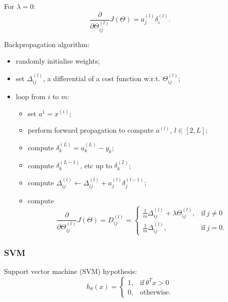 \documentclass[a4paper,11pt]{article}
\begin{document}
For \textcolor{OliveGreen}{$\lambda = 0$}:
\begin{equation}
\frac{\partial}{\partial \Theta_{ij} ^{(l)}} J \left( \Theta \right) = a_j ^{(l)} \delta_i ^{(l)} .
\end{equation}

Backpropagation algorithm:
\begin{itemize}
\item randomly initialise weights;
\item set \textcolor{OliveGreen}{$\Delta_{ij} ^{(l)}$}, a differential of a cost function w.r.t. \textcolor{OliveGreen}{$\Theta_{ij} ^{(l)}$};
\item loop from \textcolor{OliveGreen}{$i$} to \textcolor{OliveGreen}{$m$}:
\begin{itemize}
\item[--] set \textcolor{OliveGreen}{$a^{1} = x^{(i)}$};
\item[--] perform forward propagation to compute \textcolor{OliveGreen}{$a^{(l)}$}, \textcolor{OliveGreen}{$l \in \left[2, L \right]$};
\item[--] compute \textcolor{OliveGreen}{$\delta_k ^{(L)} = a_k ^{(L)} - y_k$};
\item[--] compute \textcolor{OliveGreen}{$\delta_k ^{(L-1)}$}, etc up to \textcolor{OliveGreen}{$\delta_k ^{(2)}$};
\item[--] compute \textcolor{OliveGreen}{$\Delta_{ij} ^{(l)} \leftarrow \Delta_{ij} ^{(l)} + a_j ^{(l)} \delta_j ^{(l-1)}$};
\item[--] compute
\begin{equation}
\frac{\partial}{\partial \Theta_{ij} ^{(l)}} J \left( \Theta \right) = D_{ij} ^{(l)} = \begin{cases}
      \frac{1}{m} \Delta_{ij} ^{(l)} + \lambda \Theta_{ij} ^{(l)}, & \text{if}\ j \neq 0 \\
      \frac{1}{m} \Delta_{ij} ^{(l)}, & \text{if}\ j=0 .
    \end{cases}
\end{equation}
\end{itemize}
\end{itemize}
\subsubsection{SVM}
Support vector machine (SVM) hypothesis:
\begin{equation}
h_\theta (x) = \begin{cases}
      1, & \text{if}\ \theta^T x > 0 \\
      0, & \text{otherwise} .
    \end{cases}
\end{equation}
\end{document}
